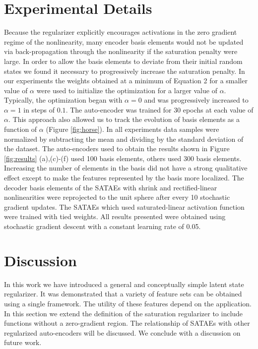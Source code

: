 \section{Experimental Details} Because the regularizer explicitly encourages
activations in the zero gradient regime of the nonlinearity, many encoder basis
elements would not be updated via back-propagation through the nonlinearity if
the saturation penalty were large. In order to allow the basis elements to
deviate from their initial random states we found it necessary to progressively
increase the saturation penalty. In our experiments the weights obtained at a
minimum of Equation 2 for a smaller value of $\alpha$ were used to initialize
the optimization for a larger value of $\alpha$. Typically, the optimization
began with $\alpha=0$ and was progressively increased to $\alpha=1$ in steps of
$0.1$. The auto-encoder was trained for 30 epochs at each value of $\alpha$.
This approach also allowed us to track the evolution of basis elements as a
function of $\alpha$ (Figure \ref{fig:horse}). In all experiments data samples
were normalized by subtracting the mean and dividing by the standard deviation
of the dataset. The auto-encoders used to obtain the results shown in Figure
\ref{fig:results} (a),(c)-(f) used 100 basis elements, others used 300 basis
elements. Increasing the number of elements in the basis did not have a strong
qualitative effect except to make the features represented by the basis more
localized. The decoder basis elements of the SATAEs with shrink and
rectified-linear nonlinearities were reprojected to the unit sphere after every
10 stochastic gradient updates. The SATAEs which used saturated-linear
activation function were trained with tied weights.  All results presented were
obtained using stochastic gradient descent with a constant learning rate of
0.05.

\section{Discussion}

In this work we have introduced a general and conceptually simple latent state
regularizer. It was demonstrated that a variety of feature sets can be obtained
using a single framework. The utility of these features depend on the
application. In this section we extend the definition of the saturation
regularizer to include functions without a zero-gradient region. The
relationship of SATAEs with other regularized auto-encoders will be discussed.
We conclude with a discussion on future work.   

